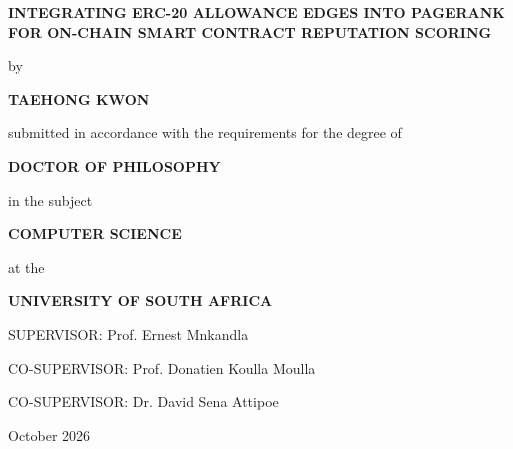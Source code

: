 \begin{titlepage}
\centering
\vspace*{0.4cm}
{\Large\bfseries INTEGRATING ERC-20 ALLOWANCE EDGES INTO PAGERANK FOR ON-CHAIN SMART CONTRACT REPUTATION SCORING\par}
\vfill
{by\par}
\vspace{0.7cm}
{\large\bfseries TAEHONG KWON\par}
\vfill
{submitted in accordance with the requirements for the degree of\par}
\vspace{0.7cm}
{\large\bfseries DOCTOR OF PHILOSOPHY\par}
\vspace{0.35cm}
{in the subject\par}
\vspace{0.7cm}
{\large\bfseries COMPUTER SCIENCE\par}
\vfill
{at the\par}
\vspace{0.7cm}
{\large\bfseries UNIVERSITY OF SOUTH AFRICA\par}
\vfill
{SUPERVISOR: Prof. Ernest Mnkandla\par}
\vspace{0.35cm}
{CO-SUPERVISOR: Prof. Donatien Koulla Moulla\par}
\vspace{0.35cm}
{CO-SUPERVISOR: Dr. David Sena Attipoe\par}
\vfill
{October 2026\par}
\end{titlepage}
\restoregeometry
